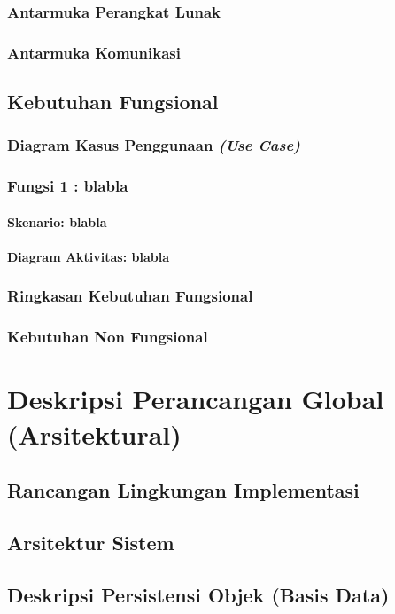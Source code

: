 \subsubsection{Antarmuka Perangkat Lunak}
\subsubsection{Antarmuka Komunikasi}
\subsection{Kebutuhan Fungsional}
\subsubsection{Diagram Kasus Penggunaan \textit{(Use Case)}} 
\subsubsection{Fungsi 1 : blabla}
\paragraph{Skenario: blabla}
\paragraph{Diagram Aktivitas: blabla}
\subsubsection{Ringkasan Kebutuhan Fungsional}
\subsubsection{Kebutuhan Non Fungsional}
\section{Deskripsi Perancangan Global (Arsitektural)}
\subsection{Rancangan Lingkungan Implementasi}
\subsection{Arsitektur Sistem}
\subsection{Deskripsi Persistensi Objek (Basis Data)}
